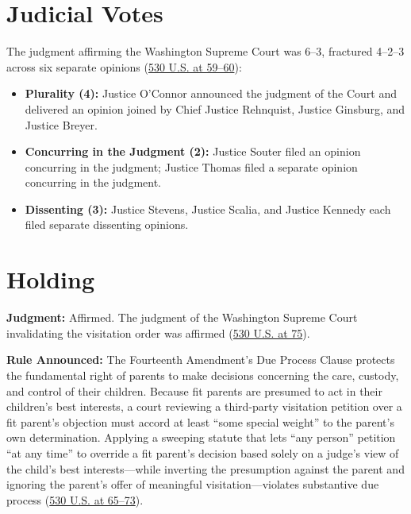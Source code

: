 \documentclass[12pt]{article}
\begin{document}
\section{Judicial Votes}
The judgment affirming the Washington Supreme Court was 6--3, fractured 4--2--3 across six separate opinions (\href{https://www.law.cornell.edu/supremecourt/text/99-138}{530 U.S. at 59--60}):
\begin{itemize}
\item \textbf{Plurality (4):} Justice O'Connor announced the judgment of the Court and delivered an opinion joined by Chief Justice Rehnquist, Justice Ginsburg, and Justice Breyer.
\item \textbf{Concurring in the Judgment (2):} Justice Souter filed an opinion concurring in the judgment; Justice Thomas filed a separate opinion concurring in the judgment.
\item \textbf{Dissenting (3):} Justice Stevens, Justice Scalia, and Justice Kennedy each filed separate dissenting opinions.
\end{itemize}

\section{Holding}
\textbf{Judgment:} Affirmed. The judgment of the Washington Supreme Court invalidating the visitation order was affirmed (\href{https://www.law.cornell.edu/supremecourt/text/99-138}{530 U.S. at 75}).

\textbf{Rule Announced:} The Fourteenth Amendment's Due Process Clause protects the fundamental right of parents to make decisions concerning the care, custody, and control of their children. Because fit parents are presumed to act in their children's best interests, a court reviewing a third-party visitation petition over a fit parent's objection must accord at least ``some special weight'' to the parent's own determination. Applying a sweeping statute that lets ``any person'' petition ``at any time'' to override a fit parent's decision based solely on a judge's view of the child's best interests---while inverting the presumption against the parent and ignoring the parent's offer of meaningful visitation---violates substantive due process (\href{https://www.law.cornell.edu/supremecourt/text/99-138}{530 U.S. at 65--73}).
\end{document}
